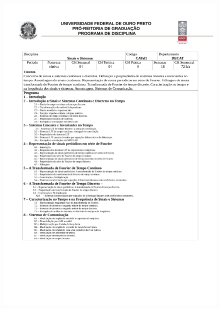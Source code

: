 \begin{figure}[p]
	\centering 
	\includegraphics[scale=0.7]{capitulos/anexo1-programas-disciplina/eg19.pdf}
\end{figure}


